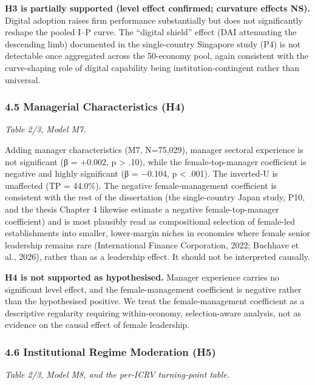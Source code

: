 \documentclass[
  12pt,a4paper]{article}
\begin{document}
\textbf{H3 is partially supported (level effect confirmed; curvature
effects NS).} Digital adoption raises firm performance substantially but
does not significantly reshape the pooled I--P curve. The ``digital
shield'' effect (DAI attenuating the descending limb) documented in the
single-country Singapore study (P4) is not detectable once aggregated
across the 50-economy pool, again consistent with the curve-shaping role
of digital capability being institution-contingent rather than
universal.

\hypertarget{managerial-characteristics-h4-1}{%
\subsubsection{4.5 Managerial Characteristics
(H4)}\label{managerial-characteristics-h4-1}}

\emph{Table 2/3, Model M7.}

Adding manager characteristics (M7, N=75,029), manager sectoral
experience is not significant (β = +0.002, p \textgreater{} .10), while
the female-top-manager coefficient is negative and highly significant (β
= −0.104, p \textless{} .001). The inverted-U is unaffected (TP =
44.0\%). The negative female-management coefficient is consistent with
the rest of the dissertation (the single-country Japan study, P10, and
the thesis Chapter 4 likewise estimate a negative female-top-manager
coefficient) and is most plausibly read as compositional selection of
female-led establishments into smaller, lower-margin niches in economies
where female senior leadership remains rare (International Finance
Corporation, 2022; Buchhave et al., 2026), rather than as a leadership
effect. It should not be interpreted causally.

\textbf{H4 is not supported as hypothesised.} Manager experience carries
no significant level effect, and the female-management coefficient is
negative rather than the hypothesised positive. We treat the
female-management coefficient as a descriptive regularity requiring
within-economy, selection-aware analysis, not as evidence on the causal
effect of female leadership.

\hypertarget{institutional-regime-moderation-h5}{%
\subsubsection{4.6 Institutional Regime Moderation
(H5)}\label{institutional-regime-moderation-h5}}

\emph{Table 2/3, Model M8, and the per-ICRV turning-point table.}
\end{document}
